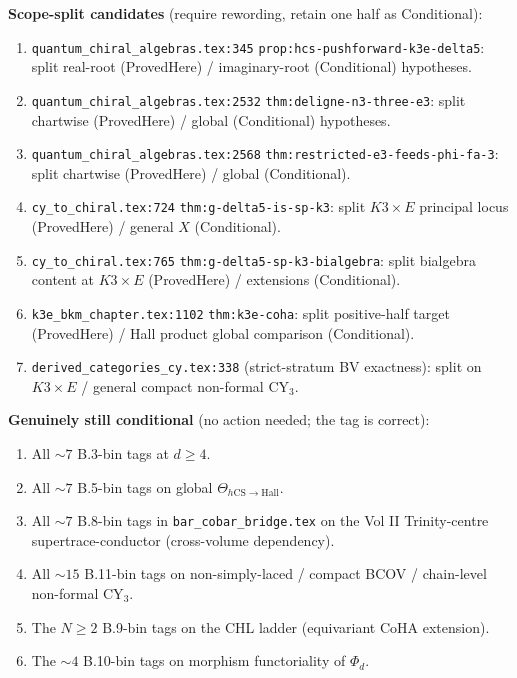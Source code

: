 \documentclass[11pt]{amsart}
\providecommand{\hCS}{h\mathrm{CS}}
\providecommand{\Hall}{\mathrm{Hall}}
\begin{document}
{{\textbf{Scope-split candidates} (require rewording, retain one half as
Conditional):
\begin{enumerate}[label=\textsc{M-\arabic*},leftmargin=*]
\item \texttt{quantum\_chiral\_algebras.tex:345} \texttt{prop:hcs-pushforward-k3e-delta5}: split real-root (ProvedHere) / imaginary-root (Conditional) hypotheses.
\item \texttt{quantum\_chiral\_algebras.tex:2532} \texttt{thm:deligne-n3-three-e3}: split chartwise (ProvedHere) / global (Conditional) hypotheses.
\item \texttt{quantum\_chiral\_algebras.tex:2568} \texttt{thm:restricted-e3-feeds-phi-fa-3}: split chartwise (ProvedHere) / global (Conditional).
\item \texttt{cy\_to\_chiral.tex:724} \texttt{thm:g-delta5-is-sp-k3}: split $K3 \times E$ principal locus (ProvedHere) / general $X$ (Conditional).
\item \texttt{cy\_to\_chiral.tex:765} \texttt{thm:g-delta5-sp-k3-bialgebra}: split bialgebra content at $K3 \times E$ (ProvedHere) / extensions (Conditional).
\item \texttt{k3e\_bkm\_chapter.tex:1102} \texttt{thm:k3e-coha}: split positive-half target (ProvedHere) / Hall product global comparison (Conditional).
\item \texttt{derived\_categories\_cy.tex:338} (strict-stratum BV exactness): split on $K3 \times E$ / general compact non-formal CY$_3$.
\end{enumerate}

\textbf{Genuinely still conditional} (no action needed; the tag is
correct):
\begin{enumerate}[label=\textsc{S-\arabic*},leftmargin=*,resume]
\item All $\sim 7$ B.3-bin tags at $d \geq 4$.
\item All $\sim 7$ B.5-bin tags on global $\Theta_{\hCS \to \Hall}$.
\item All $\sim 7$ B.8-bin tags in \texttt{bar\_cobar\_bridge.tex} on
  the Vol II Trinity-centre supertrace-conductor (cross-volume
  dependency).
\item All $\sim 15$ B.11-bin tags on non-simply-laced / compact BCOV /
  chain-level non-formal CY$_3$.
\item The $N \geq 2$ B.9-bin tags on the CHL ladder (equivariant
  CoHA extension).
\item The $\sim 4$ B.10-bin tags on morphism functoriality of $\Phi_d$.
\end{enumerate}

}}
\end{document}
